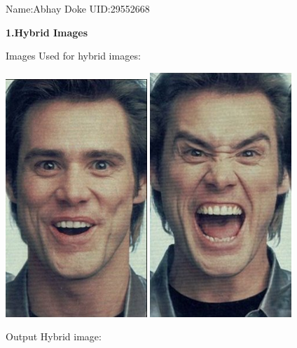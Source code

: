 \documentclass[fleqn]{article}
\begin{document}
{Name:Abhay Doke {UID:29552668}}



\textbf{\huge 1.Hybrid Images}


Images Used for hybrid images:
\vspace{10 mm}

\includegraphics[width=0.4\textwidth]{j2.jpg}
\includegraphics[width=0.4\textwidth]{j3.jpg}

\newpage

Output Hybrid image:
\end{document}
